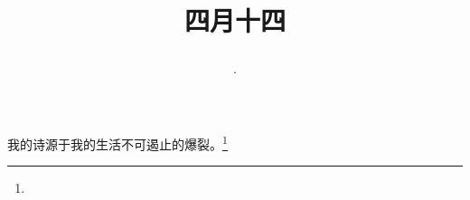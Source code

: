 \title{\date[d=21,m=5,y=2024][year:cn-y,年,month:cn,day:cn,日,·,weekday]·四月十四 }
我的诗源于我的生活不可遏止的爆裂。\footnote{ }

